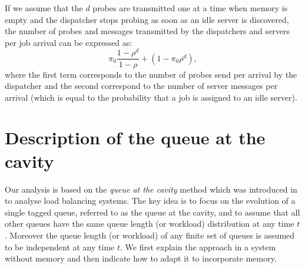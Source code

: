 \documentclass[12pt]{report}
\begin{document}
If we assume that the $d$ probes are transmitted one at a time when memory is empty and the dispatcher stops probing as soon as an idle server is discovered, the number of probes and messages transmitted by the
dispatchers and servers per job arrival can be expressed as:
\[\pi_0\frac{1-\rho^d}{1-\rho}+(1-\pi_0 \rho^d),\]
where the first term corresponds to the number of probes send per arrival by the
dispatcher and the second correspond to the number of server messages per arrival
(which is equal to the probability that a job is assigned to an idle server).




\section{Description of the queue at the cavity}  \label{sec:cavity}
Our analysis is based on the {\it queue at the cavity} method which was introduced  in \cite{bramsonLB} to analyse load balancing systems. The key idea is to focus on the evolution of a single tagged queue,
referred to as the queue at the cavity, and 
to assume that all other queues have the same queue length (or workload) distribution at any time $t$.
Moreover the queue length   (or workload) of any finite set of queues is 
assumed to be independent at any time $t$. We first explain the approach in a system without memory
and then indicate how to adapt it to incorporate memory.
\end{document}
